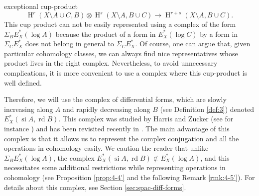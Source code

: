\documentclass[11pt,a4paper]{amsart}
\DeclareMathOperator{\si}{si}
\DeclareMathOperator{\rd}{rd}
\DeclareMathOperator{\rH}{H}
\numberwithin{equation}{section}
\theoremstyle{plain}
\theoremstyle{definition}
\begin{document}
exceptional cup-product
\begin{displaymath}
  \rH^{r}(X\setminus A\cup C,B)\otimes
  \rH^{s}(X\setminus A,B\cup C)\longrightarrow
  \rH^{r+s}(X\setminus A,B\cup C).
\end{displaymath}
This cup product can not be easily represented using a complex of the
form $\Sigma _{B}E^{\ast}_{X}(\log A)$ because the product of a form
in  $E^{\ast}_{X}(\log C)$ by a form in $\Sigma _{C}E^{\ast}_{X}$ does
not belong in general to $\Sigma _{C}E^{\ast}_{X}$. Of course, one can
argue that, given particular cohomology classes, we can always find
nice representatives whose product lives in the right complex.
Nevertheless, to avoid unnecessary complications, it is more
convenient to use a complex where this cup-product is well defined.

Therefore, we will use the complex of differential forms, which are
slowly increasing along $A$ and rapidly decreasing along $B$ (see
Definition  \ref{def:3}) denoted $E_{X}^{\ast}(\si A,\rd B)$. This complex was studied by Harris and 
 Zucker (see for instance \cite{HarrisZucker:BcSvIII}) and has been
revisited recently in \cite{BCLR:_temper_delig_shimur}.
The main advantage of this complex is that it allows us to represent
the complex conjugation and all the operations in cohomology
easily. We caution the reader that unlike $\Sigma _{B}E^{\ast}_{X}(\log A)$, the complex $E_{X}^{\ast}(\si A, \rd B)\not\subset E^{\ast}_{X}(\log A)$, and this necessitates some additional restrictions while representing operations in cohomology (see Proposition \ref{prop:4-4'} and the following Remark \ref{rmk:4-5'}). For details about this complex, see Section \ref{sec:spac-diff-forms}.
\end{document}
